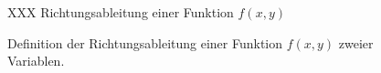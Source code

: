 %
%
%
\begin{figure}
\centering
XXX Richtungsableitung einer Funktion $f(x,y)$
\caption{Definition der Richtungsableitung einer Funktion $f(x,y)$
zweier Variablen.
\label{buch:fuvar:richtungsableitung:fig:richtungsableitung}}
\end{figure}
